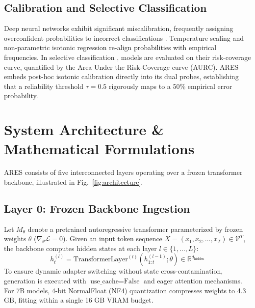\documentclass[journal,10pt,twocolumn]{IEEEtran}
\begin{document}
\subsection{Calibration and Selective Classification}
Deep neural networks exhibit significant miscalibration, frequently assigning overconfident probabilities to incorrect classifications \cite{guo2017calibration, minderer2021calibration}. Temperature scaling and non-parametric isotonic regression \cite{zadrozny2002transforming} re-align probabilities with empirical frequencies. In selective classification \cite{geifman2017selective}, models are evaluated on their risk-coverage curve, quantified by the Area Under the Risk-Coverage curve (AURC). ARES embeds post-hoc isotonic calibration directly into its dual probes, establishing that a reliability threshold $\tau = 0.5$ rigorously maps to a 50\% empirical error probability.

\section{System Architecture \& Mathematical Formulations}

ARES consists of five interconnected layers operating over a frozen transformer backbone, illustrated in Fig.~\ref{fig:architecture}.

\subsection{Layer 0: Frozen Backbone Ingestion}
Let $M_\theta$ denote a pretrained autoregressive transformer parameterized by frozen weights $\theta$ ($\nabla_\theta \mathcal{L} = 0$). Given an input token sequence $X = (x_1, x_2, \dots, x_T) \in \mathcal{V}^T$, the backbone computes hidden states at each layer $l \in \{1, \dots, L\}$:
\begin{equation}
h_t^{(l)} = \text{TransformerLayer}^{(l)}(h_{1:t}^{(l-1)}; \theta) \in \mathbb{R}^{d_{\text{hidden}}}
\end{equation}
To ensure dynamic adapter switching without state cross-contamination, generation is executed with $\text{use\_cache} = \text{False}$ and eager attention mechanisms. For 7B models, 4-bit NormalFloat (NF4) quantization \cite{dettmers2024qlora} compresses weights to 4.3 GB, fitting within a single 16 GB VRAM budget.
\end{document}
